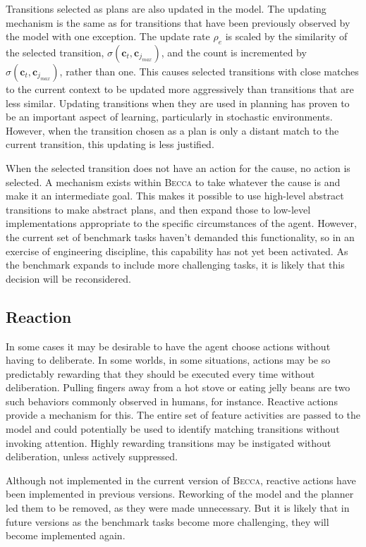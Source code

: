 Transitions selected as plans are also updated in the model. The updating mechanism is the same as for transitions that have been previously observed by the model with one exception. The update rate $\rho_e$ is scaled by the similarity of the selected transition, $\sigma(\mathbf{c}_t,\mathbf{c}_{j_{max}})$, and the count is incremented by $\sigma(\mathbf{c}_t,\mathbf{c}_{j_{max}})$, rather than one. This causes selected transitions with close matches to the current context to be updated more aggressively than transitions that are less similar. Updating transitions when they are used in planning has proven to be an important aspect of learning, particularly in stochastic environments. However, when the transition chosen as a plan is only a distant match to the current transition, this updating is less justified.

When the selected transition does not have an action for the cause, no action is selected. A mechanism exists within \textsc{Becca} to take whatever the cause is and make it an intermediate goal. This makes it possible to use high-level abstract transitions to make abstract plans, and then expand those to low-level implementations appropriate to the specific circumstances of the agent. However, the current set of benchmark tasks haven't demanded this functionality, so in an exercise of engineering discipline, this capability has not yet been activated. As the benchmark expands to include more challenging tasks, it is likely that this decision will be reconsidered.

\subsection{Reaction}
In some cases it may be desirable to have the agent choose actions without having to deliberate. In some worlds, in some situations, actions may be so predictably rewarding that they should be executed every time without deliberation. Pulling fingers away from a hot stove or eating jelly beans are two such behaviors commonly observed in humans, for instance. Reactive actions provide a mechanism for this. The entire set of feature activities are passed to the model and could potentially be used to identify matching transitions without invoking attention. Highly rewarding transitions may be instigated without deliberation, unless actively suppressed. 

Although not implemented in the current version of \textsc{Becca}, reactive actions have been implemented in previous versions. Reworking of the model and the planner led them to be removed, as they were made unnecessary. But it is likely that in future versions as the benchmark tasks become more challenging, they will become implemented again.

